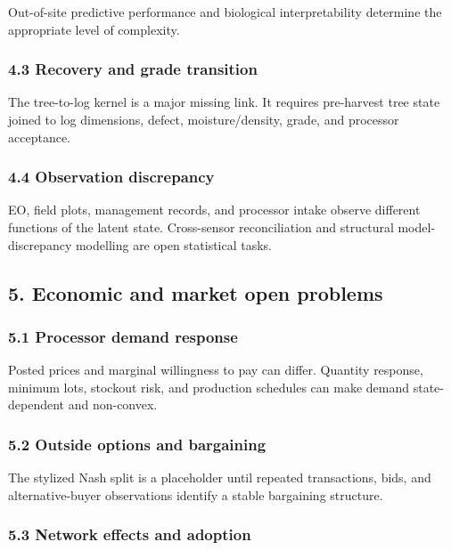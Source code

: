 Out-of-site predictive performance and biological interpretability determine the
appropriate level of complexity.

\subsubsection{4.3 Recovery and grade transition}\label{recovery-and-grade-transition}

The tree-to-log kernel is a major missing link. It requires pre-harvest tree
state joined to log dimensions, defect, moisture/density, grade, and processor
acceptance.

\subsubsection{4.4 Observation discrepancy}\label{observation-discrepancy}

EO, field plots, management records, and processor intake observe different
functions of the latent state. Cross-sensor reconciliation and structural
model-discrepancy modelling are open statistical tasks.

\subsection{5. Economic and market open problems}\label{economic-and-market-open-problems}

\subsubsection{5.1 Processor demand response}\label{processor-demand-response}

Posted prices and marginal willingness to pay can differ. Quantity response,
minimum lots, stockout risk, and production schedules can make demand
state-dependent and non-convex.

\subsubsection{5.2 Outside options and bargaining}\label{outside-options-and-bargaining}

The stylized Nash split is a placeholder until repeated transactions, bids, and
alternative-buyer observations identify a stable bargaining structure.

\subsubsection{5.3 Network effects and adoption}\label{network-effects-and-adoption}

